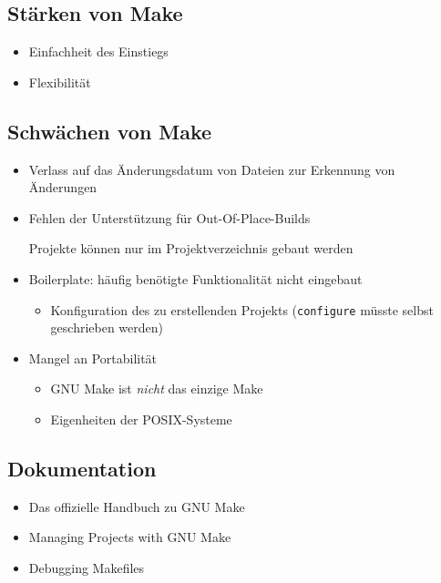 \subsection{Stärken von Make}
\begin{frame}
	\begin{itemize}
		\item Einfachheit des Einstiegs
		\item Flexibilität
	\end{itemize}
\end{frame}

\subsection{Schwächen von Make}
\begin{frame}
	\begin{itemize}
		\item Verlass auf das Änderungsdatum von Dateien zur Erkennung von Änderungen
		\item Fehlen der Unterstützung für Out-Of-Place-Builds

			Projekte können nur im Projektverzeichnis gebaut werden
		\item Boilerplate: häufig benötigte Funktionalität nicht eingebaut
			\begin{itemize}
				\item Konfiguration des zu erstellenden Projekts (\texttt{configure} müsste selbst geschrieben werden)
			\end{itemize}
		\item Mangel an Portabilität
			\begin{itemize}
				\item GNU Make ist \emph{nicht} das einzige Make
				\item Eigenheiten der POSIX-Systeme
			\end{itemize}
	\end{itemize}
\end{frame}

\subsection{Dokumentation}
\begin{frame}
	\begin{itemize}
	\item Das offizielle Handbuch zu GNU Make \cite{GNU_Make_manual}
	\item Managing Projects with GNU Make \cite{OreillyMake}
	\item Debugging Makefiles \cite{DobbsDebuggingMakefiles}
	\end{itemize}
\end{frame}

